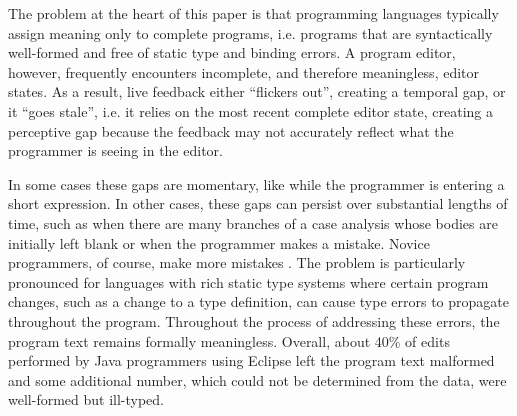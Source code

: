 %
The problem at the heart of this paper is that
programming languages typically assign meaning only to {complete programs}, i.e. programs that are syntactically well-formed and free of static type and binding errors. A program editor, however, frequently encounters incomplete, and therefore meaningless, editor states. As a result, live feedback either ``flickers out'', creating a temporal gap, or it ``goes stale'', i.e. it relies on the most recent complete editor state, creating a perceptive gap because the feedback may not accurately reflect what the programmer is seeing in the editor.

In some cases these gaps are momentary, like while the programmer
is entering  
a short expression. In other cases, these gaps can persist over substantial lengths of time, such as when there are many branches of a case analysis whose bodies are initially left blank or when the programmer makes a mistake.
%
Novice programmers, of course, make more mistakes \cite{mccauley2008debugging,fitzgerald2008debugging}.
%
The problem is particularly pronounced for languages with rich static type systems where certain program changes, such as a change to a type definition, can cause type errors to propagate throughout the program. Throughout the process of addressing these errors, the program text remains formally meaningless. 
Overall, about 40\% of edits performed by Java programmers using Eclipse left the program text malformed \cite{popl-paper,6883030} and some additional number, which could not be determined from the data, were well-formed but ill-typed.


